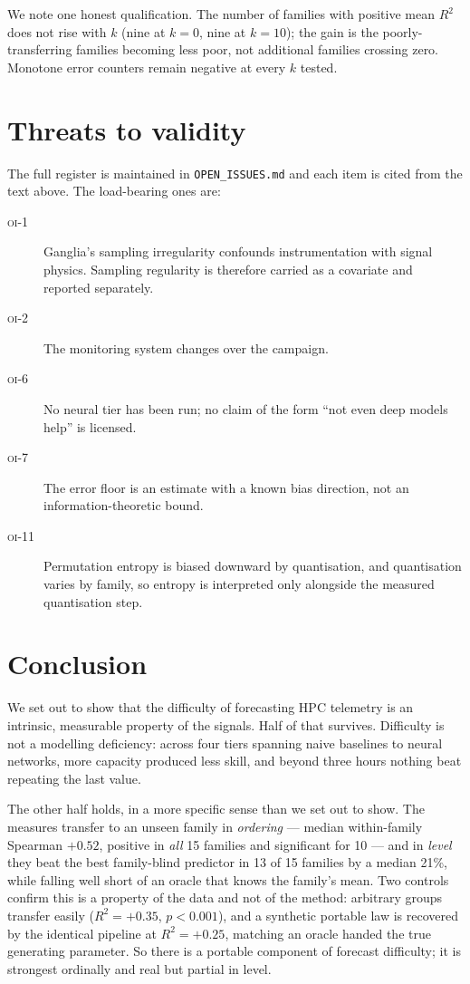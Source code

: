 \documentclass[11pt,a4paper]{article}
\newcommand{\num}[1]{#1}
\newcommand{\oi}[1]{\textsc{oi-#1}}
\begin{document}
We note one honest qualification. The number of families with positive mean
\(R^2\) does not rise with \(k\) (nine at \(k=0\), nine at \(k=10\)); the gain
is the poorly-transferring families becoming less poor, not additional families
crossing zero. Monotone error counters remain negative at every \(k\) tested.

\section{Threats to validity}
\label{sec:threats}

The full register is maintained in \texttt{OPEN\_ISSUES.md} and each item is
cited from the text above. The load-bearing ones are:

\begin{description}
  \item[\oi{1}] Ganglia's sampling irregularity confounds instrumentation with
        signal physics. Sampling regularity is therefore carried as a covariate
        and reported separately.
  \item[\oi{2}] The monitoring system changes over the campaign.
  \item[\oi{6}] No neural tier has been run; no claim of the form ``not even
        deep models help'' is licensed.
  \item[\oi{7}] The error floor is an estimate with a known bias direction, not
        an information-theoretic bound.
  \item[\oi{11}] Permutation entropy is biased downward by quantisation, and
        quantisation varies by family, so entropy is interpreted only alongside
        the measured quantisation step.
\end{description}

\section{Conclusion}

We set out to show that the difficulty of forecasting HPC telemetry is an
intrinsic, measurable property of the signals. Half of that survives. Difficulty
is not a modelling deficiency: across four tiers spanning naive baselines to
neural networks, more capacity produced less skill, and beyond three hours
nothing beat repeating the last value.

The other half holds, in a more specific sense than we set out to show. The
measures transfer to an unseen family in \emph{ordering} --- median
within-family Spearman \(+0.52\), positive in \emph{all} \num{15} families
and significant for \num{10} --- and in \emph{level} they beat the best
family-blind predictor in \num{13} of \num{15} families by a median \num{21}\%,
while falling well short of an oracle that knows the family's mean. Two controls
confirm this is a property of the data and not of the method: arbitrary groups
transfer easily (\(R^2 = +0.35\), \(p<0.001\)), and a synthetic portable law is
recovered by the identical pipeline at \(R^2 = +0.25\), matching an oracle
handed the true generating parameter. So there is a portable component of
forecast difficulty; it is strongest ordinally and real but partial in level.
\end{document}
